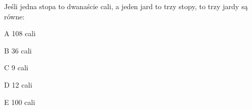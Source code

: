 \begin{tresc}
Jeśli jedna stopa to dwanaście cali, a jeden jard to trzy stopy, to trzy jardy są równe:
\end{tresc}
\begin{wariant}{A} 108 cali \end{wariant}
\begin{wariant}{B} 36 cali \end{wariant}
\begin{wariant}{C} 9 cali \end{wariant}
\begin{wariant}{D} 12 cali \end{wariant}
\begin{wariant}{E} 100 cali \end{wariant}
